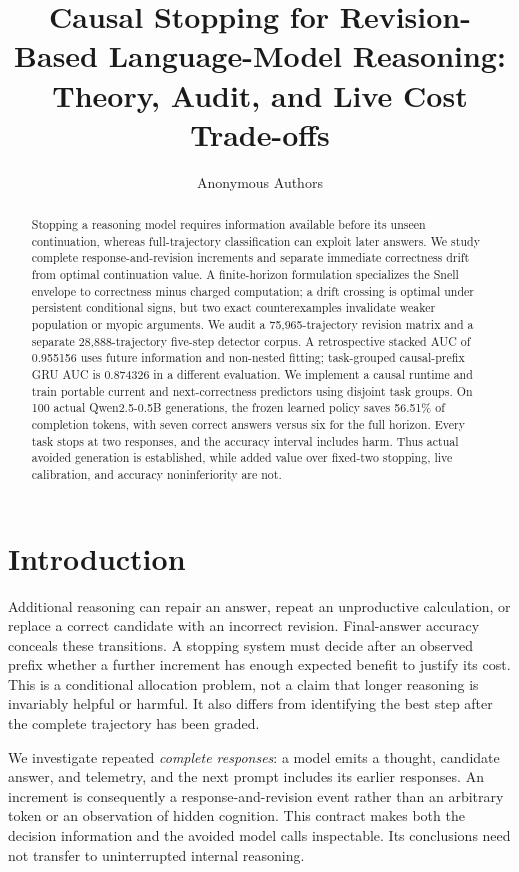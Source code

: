 \documentclass{article}
\title{Causal Stopping for Revision-Based Language-Model Reasoning:\\
Theory, Audit, and Live Cost Trade-offs}
\author{Anonymous Authors}
\begin{document}
\maketitle

\begin{abstract}
Stopping a reasoning model requires information available before its unseen
continuation, whereas full-trajectory classification can exploit later answers.
We study complete response-and-revision increments and separate immediate
correctness drift from optimal continuation value. A finite-horizon formulation
specializes the Snell envelope to correctness minus charged computation; a drift
crossing is optimal under persistent conditional signs, but two exact
counterexamples invalidate weaker population or myopic arguments. We audit a
75,965-trajectory revision matrix and a separate 28,888-trajectory five-step
detector corpus. A retrospective stacked AUC of 0.955156 uses future information
and non-nested fitting; task-grouped causal-prefix GRU AUC is 0.874326 in a
different evaluation. We implement a causal runtime and train portable current
and next-correctness predictors using disjoint task groups. On 100 actual
Qwen2.5-0.5B generations, the frozen learned policy saves 56.51\% of completion
tokens, with seven correct answers versus six for the full horizon. Every task
stops at two responses, and the accuracy interval includes harm. Thus actual
avoided generation is established, while added value over fixed-two stopping,
live calibration, and accuracy noninferiority are not.
\end{abstract}

\section{Introduction}
\label{sec:intro}
Additional reasoning can repair an answer, repeat an unproductive calculation,
or replace a correct candidate with an incorrect revision. Final-answer accuracy
conceals these transitions. A stopping system must decide after an observed
prefix whether a further increment has enough expected benefit to justify its
cost. This is a conditional allocation problem, not a claim that longer
reasoning is invariably helpful or harmful. It also differs from identifying
the best step after the complete trajectory has been graded.

We investigate repeated \emph{complete responses}: a model emits a thought,
candidate answer, and telemetry, and the next prompt includes its earlier
responses. An increment is consequently a response-and-revision event rather
than an arbitrary token or an observation of hidden cognition. This contract
makes both the decision information and the avoided model calls inspectable.
Its conclusions need not transfer to uninterrupted internal reasoning.
\end{document}
